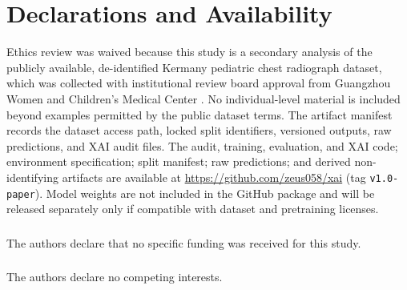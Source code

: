 \documentclass[runningheads]{llncs}
\newcommand{\citep}[1]{\cite{#1}}
\begin{document}
\section*{Declarations and Availability}

Ethics review was waived because this study is a secondary analysis of the
publicly available, de-identified Kermany pediatric chest radiograph dataset,
which was collected with institutional review board approval from Guangzhou
Women and Children's Medical Center \citep{kermany2018}. No individual-level
material is included beyond examples permitted by the public dataset terms. The
artifact manifest records the dataset access path, locked split identifiers,
versioned outputs, raw predictions, and XAI audit files. The audit, training,
evaluation, and XAI code; environment specification; split manifest; raw
predictions; and derived non-identifying artifacts are available at
\url{https://github.com/zeus058/xai} (tag \texttt{v1.0-paper}). Model weights are not
included in the GitHub package and will be released separately only if
compatible with dataset and pretraining licenses.

\begin{credits}
\subsubsection{\ackname} The authors declare that no specific funding was
received for this study.
\subsubsection{\discintname} The authors declare no competing interests.
\end{credits}



\end{document}
